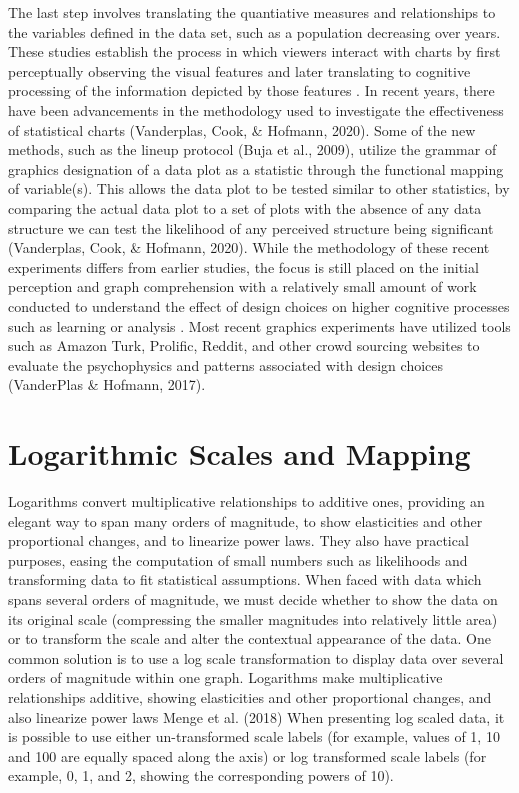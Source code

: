 \documentclass[print]{nuthesis}
\begin{document}
The last step involves translating the quantiative measures and relationships to the variables defined in the data set, such as a population decreasing over years.
These studies establish the process in which viewers interact with charts by first perceptually observing the visual features and later translating to cognitive processing of the information depicted by those features .
In recent years, there have been advancements in the methodology used to investigate the effectiveness of statistical charts (Vanderplas, Cook, \& Hofmann, 2020). Some of the new methods, such as the lineup protocol (Buja et al., 2009), utilize the grammar of graphics designation of a data plot as a statistic through the functional mapping of variable(s). This allows the data plot to be tested similar to other statistics, by comparing the actual data plot to a set of plots with the absence of any data structure we can test the likelihood of any perceived structure being significant (Vanderplas, Cook, \& Hofmann, 2020).
While the methodology of these recent experiments differs from earlier studies, the focus is still placed on the initial perception and graph comprehension with a relatively small amount of work conducted to understand the effect of design choices on higher cognitive processes such as learning or analysis .
Most recent graphics experiments have utilized tools such as Amazon Turk, Prolific, Reddit, and other crowd sourcing websites to evaluate the psychophysics and patterns associated with design choices (VanderPlas \& Hofmann, 2017).

\hypertarget{logarithmic-scales-and-mapping}{%
\section{Logarithmic Scales and Mapping}\label{logarithmic-scales-and-mapping}}

Logarithms convert multiplicative relationships to additive ones, providing an elegant way to span many orders of magnitude, to show elasticities and other proportional changes, and to linearize power laws.
They also have practical purposes, easing the computation of small numbers such as likelihoods and transforming data to fit statistical assumptions.
When faced with data which spans several orders of magnitude, we must decide whether to show the data on its original scale (compressing the smaller magnitudes into relatively little area) or to transform the scale and alter the contextual appearance of the data.
One common solution is to use a log scale transformation to display data over several orders of magnitude within one graph. Logarithms make multiplicative relationships additive, showing elasticities and other proportional changes, and also linearize power laws Menge et al. (2018)
When presenting log scaled data, it is possible to use either un-transformed scale labels (for example, values of 1, 10 and 100 are equally spaced along the axis) or log transformed scale labels (for example, 0, 1, and 2, showing the corresponding powers of 10).
\end{document}
